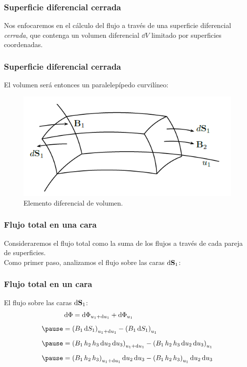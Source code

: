 \documentclass[12pt]{beamer}
\begin{document}
\begin{frame}
\frametitle{Superficie diferencial cerrada}
Nos enfocaremos en el cálculo del flujo a través de una superficie diferencial \emph{cerrada}, que contenga un volumen diferencial $\dd{V}$ limitado por superficies coordenadas.
\end{frame}
\begin{frame}
\frametitle{Superficie diferencial cerrada}
El volumen será entonces un paralelepípedo curvilíneo:
\begin{figure}[h!]
    \centering
    \includegraphics[scale=0.5]{Imagenes/Diferencial_Volumen.png}
    \caption{Elemento diferencial de volumen.}
    \label{fig:Diferencial_Volumen}
\end{figure}
\end{frame}
\begin{frame}
\frametitle{Flujo total en una cara}
Consideraremos el flujo total como la suma de los flujos a través de cada pareja de superficies.
\\
\bigskip
\pause
Como primer paso, analizamos el flujo sobre las caras $\dd{\vb{S}_{1}}$:
\end{frame}
\begin{frame}
\frametitle{Flujo total en un cara}
El flujo sobre las caras $\dd{\vb{S}_{1}}$:
\pause
\begin{eqnarray*}
\begin{aligned}
&\dd{\Phi} = \dd{\Phi_{u_{1} + \dd{u_{1}}}} + \dd{\Phi_{u_{1}}} \\[0.5em] \pause
&= \left( B_{1} \dd{S_{1}} \right)_{u_{1} + \dd{u_{1}}} - \left( B_{1} \dd{S_{1}} \right)_{u_{1}} \\[0.5em] \pause
&= \left( B_{1} \, h_{2} \, h_{3} \dd{u_{2}} \dd{u_{3}} \right)_{u_{1} + \dd{u_{1}}} - \left( B_{1} \, h_{2} \, h_{3} \dd{u_{2}} \dd{u_{3}} \right)_{u_{1}} \\[0.5em] \pause
&= \left( B_{1} \, h_{2} \, h_{3} \right)_{u_{1} + \dd{u_{1}}} \dd{u_{2}} \dd{u_{3}} - \left( B_{1} \, h_{2} \, h_{3} \right)_{u_{1}} \dd{u_{2}} \dd{u_{3}}
\end{aligned}
\end{eqnarray*}
\end{frame} 
\end{document}
